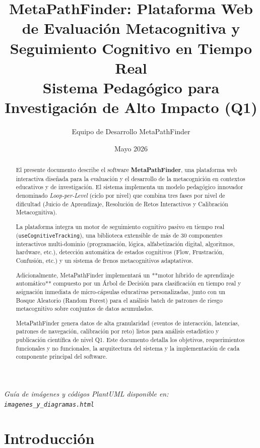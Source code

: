 \documentclass[11pt,a4paper]{article}
\title{\textbf{MetaPathFinder: Plataforma Web de Evaluación Metacognitiva y Seguimiento Cognitivo en Tiempo Real}\\[0.5em]
\large Sistema Pedagógico para Investigación de Alto Impacto (Q1)}
\author{Equipo de Desarrollo MetaPathFinder}
\date{Mayo 2026}
\begin{document}
\maketitle

\begin{center}
\textit{\small Guía de imágenes y códigos PlantUML disponible en: \texttt{imagenes\_y\_diagramas.html}}
\end{center}

\begin{abstract}
El presente documento describe el software \textbf{MetaPathFinder}, una plataforma web interactiva diseñada para la evaluación y el desarrollo de la metacognición en contextos educativos y de investigación. El sistema implementa un modelo pedagógico innovador denominado \textit{Loop-per-Level} (ciclo por nivel) que combina tres fases por nivel de dificultad (Juicio de Aprendizaje, Resolución de Retos Interactivos y Calibración Metacognitiva). 

La plataforma integra un motor de seguimiento cognitivo pasivo en tiempo real (\texttt{useCognitiveTracking}), una biblioteca extensible de más de 30 componentes interactivos multi-dominio (programación, lógica, alfabetización digital, algoritmos, hardware, etc.), detección automática de estados cognitivos (Flow, Frustración, Confusión, etc.) y un sistema de frenos metacognitivos adaptativos. 

Adicionalmente, MetaPathFinder implementará un **motor híbrido de aprendizaje automático** compuesto por un Árbol de Decisión para clasificación en tiempo real y asignación inmediata de micro-cápsulas educativas personalizadas, junto con un Bosque Aleatorio (Random Forest) para el análisis batch de patrones de riesgo metacognitivo sobre conjuntos de datos acumulados. 

MetaPathFinder genera datos de alta granularidad (eventos de interacción, latencias, patrones de navegación, calibración por reto) listos para análisis estadístico y publicación científica de nivel Q1. Este documento detalla los objetivos, requerimientos funcionales y no funcionales, la arquitectura del sistema y la implementación de cada componente principal del software.
\end{abstract}

\newpage
\tableofcontents
\newpage

\section{Introducción}
\end{document}
